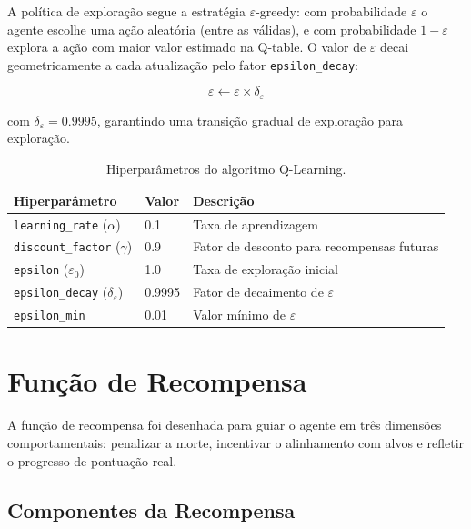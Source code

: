 \documentclass[12pt,a4paper]{article}
\begin{document}
A política de exploração segue a estratégia $\varepsilon$-greedy: com probabilidade $\varepsilon$ o agente escolhe uma ação aleatória (entre as válidas), e com probabilidade $1 - \varepsilon$ explora a ação com maior valor estimado na Q-table. O valor de $\varepsilon$ decai geometricamente a cada atualização pelo fator \texttt{epsilon\_decay}:

\begin{equation}
    \varepsilon \leftarrow \varepsilon \times \delta_\varepsilon
    \label{eq:epsilon}
\end{equation}

com $\delta_\varepsilon = 0.9995$, garantindo uma transição gradual de exploração para exploração.

\begin{table}[H]
    \centering
    \begin{tabular}{@{}lll@{}}
        \toprule
        \textbf{Hiperparâmetro} & \textbf{Valor} & \textbf{Descrição} \\
        \midrule
        \texttt{learning\_rate} ($\alpha$) & 0.1 & Taxa de aprendizagem \\
        \texttt{discount\_factor} ($\gamma$) & 0.9 & Fator de desconto para recompensas futuras \\
        \texttt{epsilon} ($\varepsilon_0$) & 1.0 & Taxa de exploração inicial \\
        \texttt{epsilon\_decay} ($\delta_\varepsilon$) & 0.9995 & Fator de decaimento de $\varepsilon$ \\
        \texttt{epsilon\_min} & 0.01 & Valor mínimo de $\varepsilon$ \\
        \bottomrule
    \end{tabular}
    \caption{Hiperparâmetros do algoritmo Q-Learning.}
    \label{tab:hyperparams}
\end{table}

\section{Função de Recompensa}
\label{sec:recompensa}

A função de recompensa foi desenhada para guiar o agente em três dimensões comportamentais: penalizar a morte, incentivar o alinhamento com alvos e refletir o progresso de pontuação real.

\subsection{Componentes da Recompensa}
\end{document}

